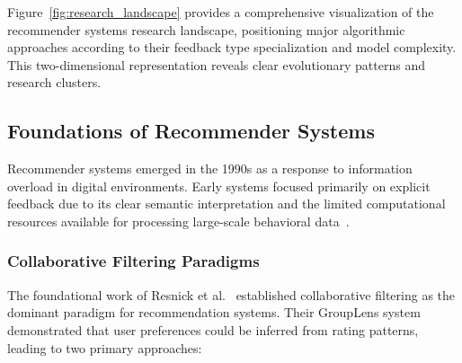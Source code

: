\begin{figure*}[ht]
\caption{Research Landscape Map: Recommendation Algorithms by Feedback Type and Complexity. Bubble size indicates research impact and adoption. The map reveals three distinct research trajectories: classical explicit methods (left), implicit-focused approaches (right), and modern hybrid systems (center), with increasing complexity from bottom to top.}
\label{fig:research_landscape}
\end{figure*}

Figure~\ref{fig:research_landscape} provides a comprehensive visualization of the recommender systems research landscape, positioning major algorithmic approaches according to their feedback type specialization and model complexity. This two-dimensional representation reveals clear evolutionary patterns and research clusters.

\subsection{Foundations of Recommender Systems}

Recommender systems emerged in the 1990s as a response to information overload in digital environments. Early systems focused primarily on explicit feedback due to its clear semantic interpretation and the limited computational resources available for processing large-scale behavioral data~\cite{resnick1994grouplens,shardanand1995social}.

\subsubsection{Collaborative Filtering Paradigms}
The foundational work of Resnick et al.~\cite{resnick1994grouplens} established collaborative filtering as the dominant paradigm for recommendation systems. Their GroupLens system demonstrated that user preferences could be inferred from rating patterns, leading to two primary approaches:

